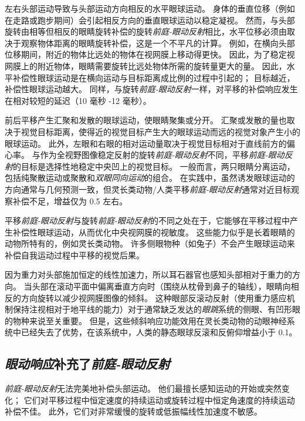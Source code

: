 左右头部运动导致与头部运动方向相反的水平眼球运动。
身体的垂直位移（例如在走路或跑步期间）会引起相反方向的垂直眼球运动以稳定凝视。
然而，与头部旋转由相等但相反的眼睛旋转补偿的旋转\textit{前庭-眼动反射}相比，水平位移必须由取决于观察物体距离的眼睛旋转补偿，这是一个不平凡的计算。
例如，在横向头部位移期间，附近的物体比远处的物体在视网膜上移动得更快。
因此，为了稳定视网膜上的附近物体，眼睛需要旋转比远处物体所需的旋转量更大的量。
因此，水平补偿性眼球运动是在横向运动与目标距离成比例的过程中引起的；
目标越近，补偿性眼球运动越大。
同样，与旋转\textit{前庭-眼动反射}一样，对平移的补偿响应发生在相对较短的延迟（10 毫秒 -12 毫秒）。


前后平移产生汇聚和发散的眼球运动，使眼睛聚集或分开。
汇聚或发散的量也取决于视觉目标距离，使得近的视觉目标产生大的眼球运动而远的视觉对象产生小的眼球运动。
此外，左眼和右眼的相对运动量取决于视觉目标相对于直线前方的偏心率。
与作为全视野图像稳定反射的旋转\textit{前庭-眼动反射}不同，平移\textit{前庭-眼动反射}的目标是选择性地稳定中央凹上的视觉目标。
一般而言，两只眼睛分离运动，包括纯聚散运动或聚散和\textit{双眼同向运动}的组合。
在实践中，虽然诱发眼球运动的方向通常与几何预测一致，但灵长类动物/人类平移\textit{前庭-眼动反射}通常对近目标观察补偿不足，增益仅为 0.5 左右。


平移\textit{前庭-眼动反射}与旋转\textit{前庭-眼动反射}的不同之处在于，它能够在平移过程中产生补偿性眼球运动，从而优化中央视网膜的视敏度。
这些能力似乎是长着眼睛的动物所特有的，例如灵长类动物。
许多侧眼物种（如兔子）不会产生眼球运动来补偿自我运动过程中平移的视觉后果。


因为重力对头部施加恒定的线性加速力，所以耳石器官也感知头部相对于重力的方向。
当头部在滚动平面中偏离垂直方向时（围绕从枕骨到鼻子的轴线），眼睛向相反的方向旋转以减少视网膜图像的倾斜。
这种眼部反滚动反射（使用重力感应机制保持注视相对于地平线的能力）对于通常缺乏发达的\textit{眼跳}系统的侧眼、有凹形眼的物种来说至关重要。
但是，这些倾斜响应功能效用在灵长类动物的动眼神经系统中已经失去了优势，在该系统中，人类的静态眼球反滚和反俯仰增益小于 0.1。



\subsection{\textit{眼动响应}补充了\textit{前庭-眼动反射}}

\textit{前庭-眼动反射}无法完美地补偿头部运动。
他们最擅长感知运动的开始或突然变化；
它们对平移过程中恒定速度的持续运动或旋转过程中恒定角速度的持续运动补偿不佳。
此外，它们对非常缓慢的旋转或低振幅线性加速度不敏感。


